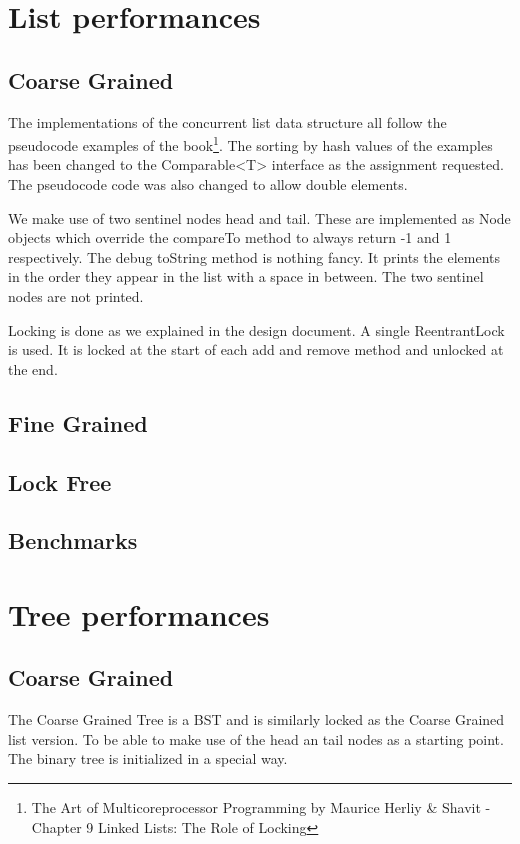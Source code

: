 \documentclass[10pt,a4paper]{article}
\begin{document}
\section{List performances}
\subsection{Coarse Grained}
The implementations of the concurrent list data structure all follow the pseudocode examples of the book\footnote{The Art of Multicoreprocessor Programming by Maurice Herliy \& Shavit - Chapter 9 Linked Lists: The Role of Locking}. The sorting by hash values of the examples has been changed to the Comparable<T> interface as the assignment requested. The pseudocode code was also changed to allow double elements.

We make use of two sentinel nodes head and tail. These are implemented as Node objects which override the compareTo method to always return -1 and 1 respectively. The debug toString method is nothing fancy. It prints the elements in the order they appear in the list with a space in between. The two sentinel nodes are not printed.

Locking is done as we explained in the design document. A single ReentrantLock is used. It is locked at the start of each add and remove method and unlocked at the end.

\subsection{Fine Grained}

\subsection{Lock Free}

\subsection{Benchmarks}

\section{Tree performances}
\subsection{Coarse Grained}
The Coarse Grained Tree is a BST and is similarly locked as the Coarse Grained list version. To be able to make use of the head an tail nodes as a starting point. The binary tree is initialized in a special way. 
\end{document}
